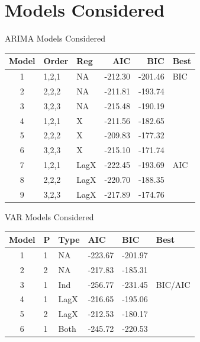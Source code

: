 \documentclass[ignorenonframetext]{beamer}
\begin{document}
 \section{Models Considered}
 
  	\begin{frame}{ARIMA Models Considered}
  		\begin{table}[htb]
\centering
\begin{tabular}{cllrrl}
  \hline
 Model & Order & Reg  & AIC & BIC & Best \\ 
  \hline
1 & 1,2,1 &  NA &   -212.30 & -201.46 & BIC \\ 
  2  & 2,2,2 & NA   & -211.81 & -193.74 &  \\ 
  3  & 3,2,3 &  NA  & -215.48 & -190.19 &  \\ 
  4  & 1,2,1 & X  & -211.56 & -182.65 &  \\ 
  5  & 2,2,2 & X   & -209.83 & -177.32 &  \\ 
  6  & 3,2,3 & X   & -215.10 & -171.74 &  \\ 
  7  & 1,2,1 &  LagX & -222.45 & -193.69 & AIC \\ 
  8  & 2,2,2 &  LagX & -220.70 & -188.35 &  \\ 
  9  & 3,2,3 &  LagX & -217.89 & -174.76 &  \\ 
   \hline
\end{tabular}
\end{table}
  	\end{frame}
 
  	\begin{frame}{VAR Models Considered}
 \begin{table}[htb]
\centering
\begin{tabular}{clllll}
  \hline
 Model & P & Type &  AIC & BIC & Best \\ 
  \hline
1  & 1 & NA  &  -223.67 & -201.97 &  \\ 
  2  & 2 & NA  &   -217.83 & -185.31 &  \\ 
  3  & 1 & Ind  & -256.77 & -231.45 & BIC/AIC \\ 
  4  & 1 & LagX & -216.65 & -195.06 &  \\ 
  5  & 2 & LagX & -212.53 & -180.17 &  \\ 
  6  & 1 & Both  & -245.72 & -220.53 &  \\ 
   \hline
\end{tabular}
\end{table}
  	\end{frame}
 
\end{document}
